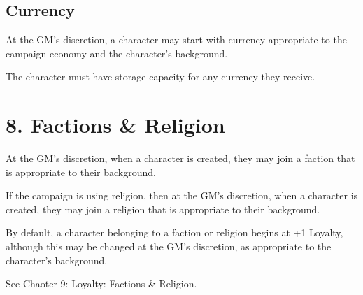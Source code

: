 \subsection{Currency}
At the GM's discretion, a character may start with currency 
appropriate to the campaign economy and the character's background. 

\vspace{0.4em}

The character must have storage capacity for any currency they receive.



\section{8. Factions \& Religion}
At the GM's discretion, when a character is created, 
they may join a faction that is appropriate to their background.

\vspace{0.4em}

If the campaign is using religion, then at the GM's discretion, when a character is created, 
they may join a religion that is appropriate to their background.

\vspace{0.4em}

By default, a character belonging to a faction or religion begins at +1 Loyalty,
although this may be changed at the GM's discretion, as appropriate to the character's background.

\vspace{0.4em}

See Chaoter 9: Loyalty: Factions \& Religion.

